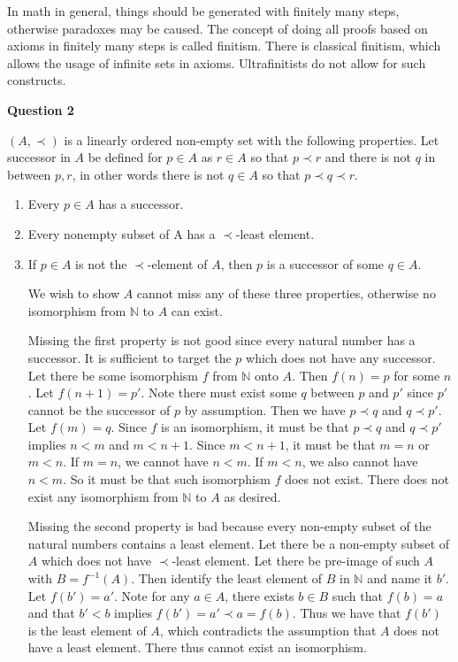 \documentclass{article}
\begin{document}
In math in general, things should be generated with finitely many steps, otherwise paradoxes may be caused. The concept of doing all proofs based on axioms in finitely many steps is called finitism. There is classical finitism, which allows the usage of infinite sets in axioms. Ultrafinitists do not allow for such constructs.

\medskip
\textbf{Question 2}
\medskip

$(A, \prec)$ is a linearly ordered non-empty set with the following properties. 
Let successor in $A$ be defined for $p \in A$ as $r \in A$ so that $p \prec r$ and there is not $q$ in between $p,r$, in other words there is not $q \in A$ so that $p \prec q \prec r$.

\begin{enumerate}
\item Every $p \in A$ has a successor. 
\item Every nonempty subset of A has a $\prec$-least element.
\item If $p \in A$ is not the $\prec$-element of $A$, then $p$ is a successor of some $q \in A$.

We wish to show $A$ cannot miss any of these three properties, otherwise no isomorphism from $\mathbb{N}$ to $A$ can exist.

\medskip

Missing the first property is not good since every natural number has a successor. It is sufficient to target the $p$ which does not have any successor. Let there be some isomorphism $f$ from $\mathbb{N}$ onto $A$. Then $f(n) = p$ for some $n$. Let $f(n + 1) = p'$. Note there must exist some $q$ between $p$ and $p'$ since $p'$ cannot be the successor of $p$ by assumption. Then we have $p \prec q$ and $q \prec p'$. Let $f(m) = q$. Since $f$ is an isomorphism, it must be that $p \prec q$ and $q \prec p'$ implies $n < m$ and $m < n + 1$. Since $m < n + 1$, it must be that $m = n$ or $m < n$. If $m = n$, we cannot have $n < m$. If $m < n$, we also cannot have $n < m$. So it must be that such isomorphism $f$ does not exist. There does not exist any isomorphism from $\mathbb{N}$ to $A$ as desired.

\medskip

Missing the second property is bad because every non-empty subset of the natural numbers contains a least element. Let there be a non-empty subset of $A$ which does not have $\prec$-least element. Let there be pre-image of such $A$ with $B = f^{-1}(A)$. Then identify the least element of $B$ in $\mathbb{N}$ and name it $b'$. Let $f(b') = a'$. Note for any $a \in A$, there exists $b \in B$ such that $f(b) = a$ and that $b' < b$ implies $f(b') = a' \prec a = f(b)$. Thus we have that $f(b')$ is the least element of $A$, which contradicts the assumption that $A$ does not have a least element. There thus cannot exist an isomorphism.


\end{enumerate}
\end{document}
